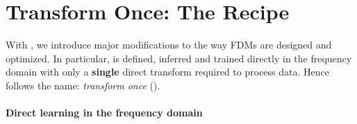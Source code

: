 %
\section{Transform Once: The \ourmethod{} Recipe}\label{sec:t1rec}

With \ourmethod{}, we introduce major modifications to the way FDMs are designed and optimized. In particular, \ourmethod{} is defined, inferred and trained directly in the frequency domain with only a \textbf{single} direct transform required to process data. Hence follows the name: \textit{transform once} (\ourmethod{}).


\paragraph{Direct learning in the frequency domain} 


